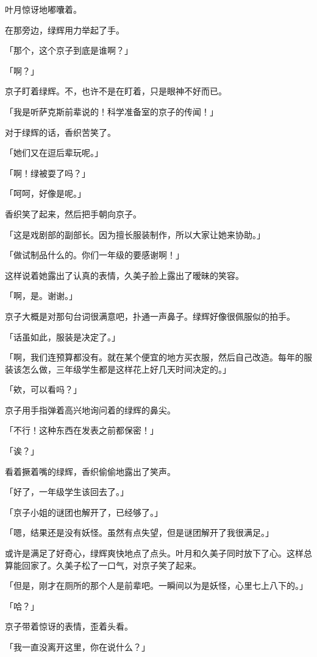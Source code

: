 \documentclass[UTF8]{ctexart}
\begin{document}
    叶月惊讶地嘟囔着。

    在那旁边，绿辉用力举起了手。

    「那个，这个京子到底是谁啊？」

    「啊？」

    京子盯着绿辉。不，也许不是在盯着，只是眼神不好而已。

    「我是听萨克斯前辈说的！科学准备室的京子的传闻！」

    对于绿辉的话，香织苦笑了。

    「她们又在逗后辈玩呢。」

    「啊！绿被耍了吗？」

    「呵呵，好像是呢。」

    香织笑了起来，然后把手朝向京子。

    「这是戏剧部的副部长。因为擅长服装制作，所以大家让她来协助。」

    「做试制品什么的。你们一年级的要感谢啊！」

    这样说着她露出了认真的表情，久美子脸上露出了暧昧的笑容。

    「啊，是。谢谢。」

    京子大概是对那句台词很满意吧，扑通一声鼻子。绿辉好像很佩服似的拍手。

    「话虽如此，服装是决定了。」

    「啊，我们连预算都没有。就在某个便宜的地方买衣服，然后自己改造。每年的服装该怎么做，三年级学生都是这样花上好几天时间决定的。」

    「欸，可以看吗？」

    京子用手指弹着高兴地询问着的绿辉的鼻尖。

    「不行！这种东西在发表之前都保密！」

    「诶？」

    看着撅着嘴的绿辉，香织偷偷地露出了笑声。

    「好了，一年级学生该回去了。」

    「京子小姐的谜团也解开了，已经够了。」

    「嗯，结果还是没有妖怪。虽然有点失望，但是谜团解开了我很满足。」

    或许是满足了好奇心，绿辉爽快地点了点头。叶月和久美子同时放下了心。这样总算能回家了。久美子松了一口气，对京子笑了起来。

    「但是，刚才在厕所的那个人是前辈吧。一瞬间以为是妖怪，心里七上八下的。」

    「哈？」

    京子带着惊讶的表情，歪着头看。

    「我一直没离开这里，你在说什么？」
\end{document}
